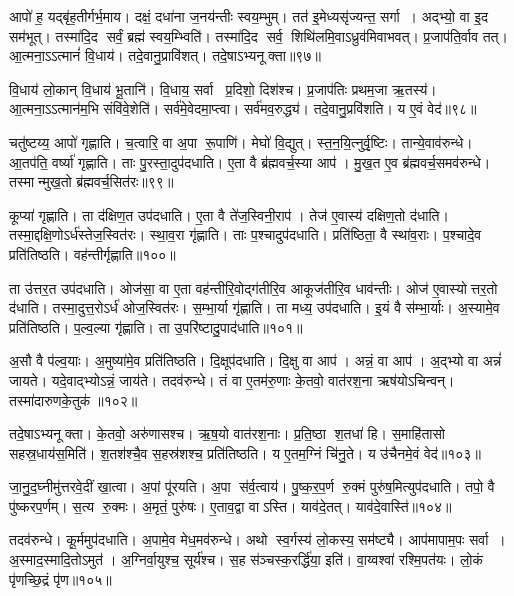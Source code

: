 आपो॑ ह॒ यद्बृ॑ह॒तीर्गर्भ॒माय\snn{}। दक्षं॒ दधा॑ना ज॒नय॑न्तीः स्वय॒म्भुम्‌। 
तत॑ इ॒मेध्यसृ॑ज्यन्त॒ सर्गा। अद्भ्यो॒ वा इ॒द सम॑भूत्‌। 
तस्मा॑दि॒द सर्वं॒ ब्रह्म॑ स्वय॒म्भ्विति॑। 
तस्मा॑दि॒द सर्व॒ शिथि॑लमि॒वाऽध्रुव॑मिवाभवत्‌। 
प्र॒जाप॑ति॒र्वाव तत्‌। आ॒त्मना॒ऽऽत्मानं॑ वि॒धाय॑। 
तदे॒वानु॒प्रावि॑शत्‌। तदे॒षाऽभ्यनूक्ता॥९७॥


वि॒धाय॑ लो॒कान्‌ वि॒धाय॑ भू॒तानि॑। वि॒धाय॒ सर्वा प्र॒दिशो॒ दिश॑श्च। 
प्र॒जाप॑तिः प्रथम॒जा ऋ॒तस्य॑। आ॒त्मना॒ऽऽत्मान॑म॒भि संवि॑वे॒शेति॑। 
सर्व॑मे॒वेदमा॒प्त्वा। सर्व॑मव॒रुद्ध्य॑। 
तदे॒वानु॒प्रवि॑शति। य ए॒वं वेद॑॥९८॥\anuvakamend


चतु॑ष्टय्य॒ आपो॑ गृह्णाति। च॒त्वारि॒ वा अ॒पा रू॒पाणि॑। 
मेघो॑ वि॒द्युत्‌। स्त॒न॒यि॒त्नुर्वृ॒ष्टिः। तान्ये॒वाव॑रुन्धे। 
आ॒तप॑ति॒ वर्ष्या॑ गृह्णाति। ताः पु॒रस्ता॒दुप॑दधाति। 
ए॒ता वै ब्र॑ह्मवर्च॒स्या आप॑। मु॒ख॒त ए॒व ब्र॑ह्मवर्च॒समव॑रुन्धे। 
तस्मान्मुख॒तो ब्र॑ह्मवर्च॒सित॑रः॥९९॥


कूप्या॑ गृह्णाति। ता द॑क्षिण॒त उप॑दधाति। 
ए॒ता वै ते॑ज॒स्विनी॒राप॑। तेज॑ ए॒वास्य॑ दक्षिण॒तो द॑धाति। 
तस्मा॒द्दक्षि॒णोऽर्ध॑स्तेज॒स्वित॑रः। स्था॒व॒रा गृ॑ह्णाति। 
ताः प॒श्चादुप॑दधाति। प्रति॑ष्ठिता॒ वै स्था॑व॒राः। 
प॒श्चादे॒व प्रति॑तिष्ठति। वह॑न्तीर्गृह्णाति॥१००॥


ता उ॑त्तर॒त उप॑दधाति। ओज॑सा॒ वा ए॒ता वह॑न्तीरि॒वोद्ग॑तीरि॒व आकूज॑तीरि॒व धाव॑न्तीः। 
ओज॑ ए॒वास्योत्तर॒तो द॑धाति। तस्मा॒दुत्त॒रोऽर्ध॑ ओज॒स्वित॑रः। 
स॒म्भा॒र्या गृ॑ह्णाति। ता मध्य॒ उप॑दधाति। 
इ॒यं वै स॑म्भा॒र्याः। अ॒स्यामे॒व प्रति॑तिष्ठति। 
प॒ल्व॒ल्या गृ॑ह्णाति। ता उ॒परि॑ष्टादु॒पाद॑धाति॥१०१॥


अ॒सौ वै प॑ल्व॒याः। अ॒मुष्या॑मे॒व प्रति॑तिष्ठति। 
दि॒क्षूप॑दधाति। दि॒क्षु वा आप॑। 
अन्नं॒ वा आप॑। अ॒द्भ्यो वा अन्नं॑ जायते। 
यदे॒वाद्भ्योऽन्नं॒ जाय॑ते। तदव॑रुन्धे। 
तं वा ए॒तम॑रु॒णाः के॒तवो॒ वात॑रश॒ना ऋष॑योऽचिन्वन्। 
तस्मा॑दारुणके॒तुक॑॥१०२॥


तदे॒षाऽभ्यनूक्ता। के॒तवो॒ अरु॑णासश्च। 
ऋ॒ष॒यो वात॑रश॒नाः। प्र॒ति॒ष्ठा श॒तधा॑ हि। 
स॒माहि॑तासो सहस्र॒धाय॑स॒मिति॑। श॒तश॑श्चै॒व स॒हस्र॑शश्च॒ प्रति॑तिष्ठति। 
य ए॒तम॒ग्निं चि॑नु॒ते। य उ॑चैनमे॒वं वेद॑॥१०३॥\anuvakamend


जा॒नु॒द॒घ्नीमु॑त्तरवे॒दीं खा॒त्वा। अ॒पां पू॑रयति। 
अ॒पा स॑र्व॒त्वाय॑। पु॒ष्क॒र॒प॒र्ण रु॒क्मं पुरु॑ष॒मित्युप॑दधाति। 
तपो॒ वै पु॑ष्करप॒र्णम्‌। स॒त्य रु॒क्मः। 
अ॒मृतं॒ पुरु॑षः। ए॒ताव॒द्वा वाऽस्ति। 
याव॑दे॒तत्। याव॑दे॒वास्ति॑॥१०४॥


तदव॑रुन्धे। कू॒र्ममुप॑दधाति। 
अ॒पामे॒व मेध॒मव॑रुन्धे। अथो स्व॒र्गस्य॑ लो॒कस्य॒ सम॑ष्ट्यै। 
आप॑मापाम॒पः सर्वा। अ॒स्माद॒स्मादि॒तोऽमुत॑। 
अ॒ग्निर्वा॒युश्च॒ सूर्य॑श्च। स॒ह स॑ञ्चस्क॒रर्द्धि॑या॒ इति॑। 
वा॒य्वश्वा॑ रश्मि॒पत॑यः। लो॒कं पृ॑णच्छि॒द्रं पृ॑ण॥१०५॥


